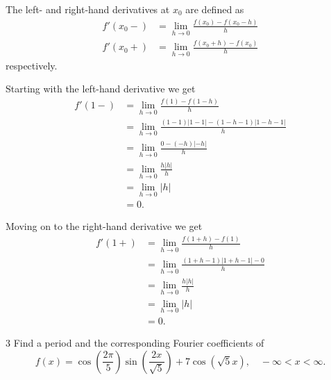 \begin{derivation}
  The left- and right-hand derivatives at $x_0$ are defined as
  \begin{align*}
    f'(x_0-) &= \lim_{h \to 0} \frac{f(x_0) - f(x_0 - h)}{h} \\
    f'(x_0+) &= \lim_{h \to 0} \frac{f(x_0 + h) - f(x_0)}{h}
  \end{align*}
  respectively.

  Starting with the left-hand derivative we get
  \begin{align*}
    f'(1-) &= \lim_{h \to 0} \frac{f(1) - f(1-h)}{h} \\
    &= \lim_{h \to 0} \frac{(1-1)|1-1| - (1-h-1)|1-h-1|}{h} \\
    &= \lim_{h \to 0}\frac{0 - (-h) |-h|}{h} \\
    &= \lim_{h \to 0} \frac{h |h|}{h} \\
    &= \lim_{h \to 0} |h| \\
    &= 0
  .\end{align*}

  Moving on to the right-hand derivative we get
  \begin{align*}
    f'(1+) &= \lim_{h \to 0} \frac{f(1+h) - f(1)}{h} \\
    &= \lim_{h \to 0} \frac{(1 + h - 1)|1 + h - 1| - 0}{h} \\
    &= \lim_{h \to 0} \frac{h |h|}{h} \\
    &= \lim_{h \to 0} |h| \\
    &= 0
  .\end{align*}
\end{derivation}


\begin{problem}{3}
  Find a period and the corresponding Fourier coefficients of
  \begin{equation*}
    f(x) = \cos \left( \frac{2\pi}{5} \right) \sin \left( \frac{2x}{\sqrt{5}} \right) + 7 \cos \left( \sqrt{5}x \right), \quad -\infty < x < \infty
  .\end{equation*}
\end{problem}

